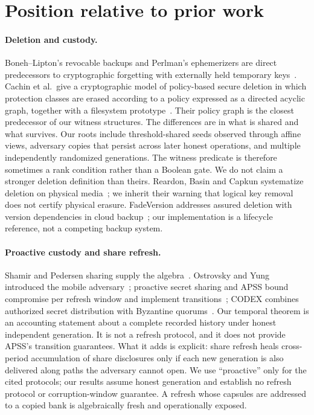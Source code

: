 \documentclass[pdflatex,sn-mathphys-num]{sn-jnl}
\theoremstyle{plain}
\theoremstyle{definition}
\begin{document}
\section{Position relative to prior work}\label{sec:related}

\paragraph{Deletion and custody.}
Boneh--Lipton's revocable backups and Perlman's ephemerizers are direct predecessors to cryptographic forgetting with externally held temporary keys~\cite{boneh1996,perlman2007}. Cachin et al.\ give a cryptographic model of policy-based secure deletion in which protection classes are erased according to a policy expressed as a directed acyclic graph, together with a filesystem prototype~\cite{cachin2013}. Their policy graph is the closest predecessor of our witness structures. The differences are in what is shared and what survives. Our roots include threshold-shared seeds observed through affine views, adversary copies that persist across later honest operations, and multiple independently randomized generations. The witness predicate is therefore sometimes a rank condition rather than a Boolean gate. We do not claim a stronger deletion definition than theirs. Reardon, Basin and Capkun systematize deletion on physical media~\cite{reardon2013}; we inherit their warning that logical key removal does not certify physical erasure. FadeVersion addresses assured deletion with version dependencies in cloud backup~\cite{rahumed2011}; our implementation is a lifecycle reference, not a competing backup system.

\paragraph{Proactive custody and share refresh.}
Shamir and Pedersen sharing supply the algebra~\cite{shamir1979,pedersen1991}. Ostrovsky and Yung introduced the mobile adversary~\cite{ostrovsky1991}; proactive secret sharing and APSS bound compromise per refresh window and implement transitions~\cite{herzberg1995,zhou2005}; CODEX combines authorized secret distribution with Byzantine quorums~\cite{marsh2004}. Our temporal theorem is an accounting statement about a complete recorded history under honest independent generation. It is not a refresh protocol, and it does not provide APSS's transition guarantees. What it adds is explicit: share refresh heals cross-period accumulation of share disclosures only if each new generation is also delivered along paths the adversary cannot open. We use ``proactive'' only for the cited protocols; our results assume honest generation and establish no refresh protocol or corruption-window guarantee. A refresh whose capsules are addressed to a copied bank is algebraically fresh and operationally exposed.
\end{document}
